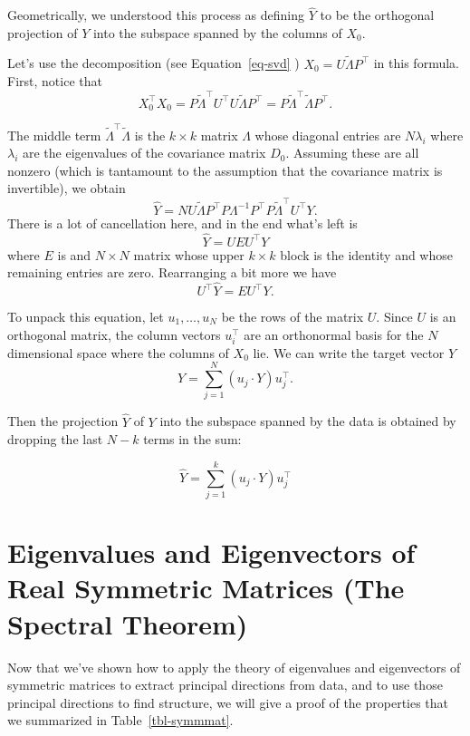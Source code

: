 \documentclass[
  11pt,
  letterpaper,
]{scrbook}
\theoremstyle{plain}
\theoremstyle{remark}
\begin{document}
Geometrically, we understood this process as defining \(\hat{Y}\) to be
the orthogonal projection of \(Y\) into the subspace spanned by the
columns of \(X_{0}\).

Let's use the decomposition (see Equation~\ref{eq-svd} )
\(X_{0}=U\tilde{\Lambda}P^{\intercal}\) in this formula. First, notice
that \[
X_{0}^{\intercal}X_{0}= P\tilde{\Lambda}^{\intercal}U^{\intercal}U\tilde{\Lambda}P^{\intercal} = P\tilde{\Lambda}^{\intercal}\tilde{\Lambda}P^{\intercal}.
\]

The middle term \(\tilde{\Lambda}^{\intercal}\tilde{\Lambda}\) is the
\(k\times k\) matrix \(\Lambda\) whose diagonal entries are
\(N\lambda_{i}\) where \(\lambda_{i}\) are the eigenvalues of the
covariance matrix \(D_{0}\). Assuming these are all nonzero (which is
tantamount to the assumption that the covariance matrix is invertible),
we obtain \[
\hat{Y} = NU\tilde{\Lambda}P^{\intercal}P\Lambda^{-1}P^{\intercal}P\tilde{\Lambda}^{\intercal}U^{\intercal}Y.
\] There is a lot of cancellation here, and in the end what's left is \[
\hat{Y}=UEU^{\intercal}Y
\] where \(E\) is and \(N\times N\) matrix whose upper \(k\times k\)
block is the identity and whose remaining entries are zero. Rearranging
a bit more we have \[
U^{\intercal}\hat{Y} = EU^{\intercal}Y.
\]

To unpack this equation, let \(u_{1},\ldots, u_{N}\) be the rows of the
matrix \(U\). Since \(U\) is an orthogonal matrix, the column vectors
\(u_{i}^{\intercal}\) are an orthonormal basis for the \(N\) dimensional
space where the columns of \(X_{0}\) lie. We can write the target vector
\(Y\) \[
Y = \sum_{j=1}^{N} (u_{j}\cdot Y)u_{j}^{\intercal}.
\]

Then the projection \(\hat{Y}\) of \(Y\) into the subspace spanned by
the data is obtained by dropping the last \(N-k\) terms in the sum:

\[
\hat{Y}=\sum_{j=1}^{k} (u_{j}\cdot Y)u_{j}^{\intercal}
\]

\hypertarget{sec-spectraltheorem}{%
\section{Eigenvalues and Eigenvectors of Real Symmetric Matrices (The
Spectral Theorem)}\label{sec-spectraltheorem}}

Now that we've shown how to apply the theory of eigenvalues and
eigenvectors of symmetric matrices to extract principal directions from
data, and to use those principal directions to find structure, we will
give a proof of the properties that we summarized in
Table~\ref{tbl-symmmat}.
\end{document}
